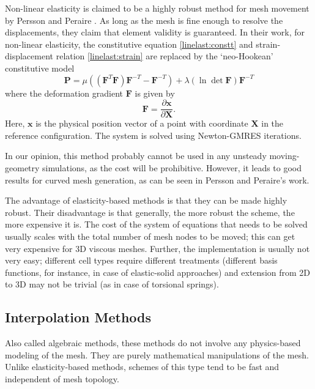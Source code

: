 \documentclass[letterpaper,11pt]{article}
\let\bld\boldsymbol
\begin{document}
Non-linear elasticity is claimed to be a highly robust method for mesh movement by Persson and Peraire \cite{curve:persson}. As long as the mesh is fine enough to resolve the displacements, they claim that element validity is guaranteed. In their work, for non-linear elasticity, the constitutive equation \eqref{linelast:constt} and strain-displacement relation \eqref{linelast:strain} are replaced by the `neo-Hookean' constitutive model
\begin{equation}
\bld{P} = \mu ((\boldsymbol{F}^T\bld{F})\bld{F}^{-T} - \bld{F}^{-T}) + \lambda(\ln \det\bld{F})\bld{F}^{-T}
\end{equation}
where the deformation gradient $\bld{F}$ is given by
\[
\bld{F} = \frac{\partial\bld{x}}{\partial\bld{X}}.
\]
Here, $\bld{x}$ is the physical position vector of a point with coordinate $\bld{X}$ in the reference configuration. The system is solved using Newton-GMRES iterations.

In our opinion, this method probably cannot be used in any unsteady moving-geometry simulations, as the cost will be prohibitive. However, it leads to good results for curved mesh generation, as can be seen in Persson and Peraire's work.

The advantage of elasticity-based methods is that they can be made highly robust. Their disadvantage is that generally, the more robust the scheme, the more expensive it is. The cost of the system of equations that needs to be solved usually scales with the total number of mesh nodes to be moved; this can get very expensive for 3D viscous meshes. Further, the implementation is usually not very easy; different cell types require different treatments (different basis functions, for instance, in case of elastic-solid approaches) and extension from 2D to 3D may not be trivial (as in case of torsional springs).

\subsection{Interpolation  Methods}
Also called algebraic methods, these methods do not involve any physics-based modeling of the mesh. They are purely mathematical manipulations of the mesh. Unlike elasticity-based methods, schemes of this type tend to be fast and independent of mesh topology. 
\end{document}
